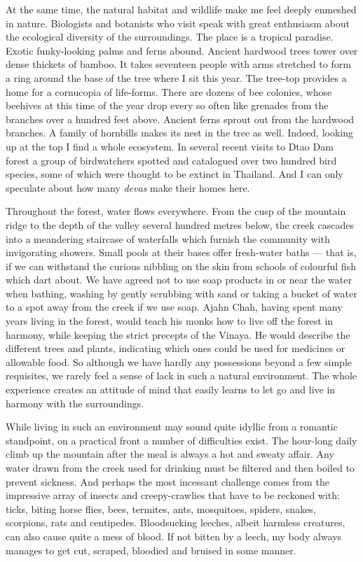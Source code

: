 At the same time, the natural habitat and wildlife make me feel deeply
enmeshed in nature. Biologists and botanists who visit speak with great
enthusiasm about the ecological diversity of the surroundings. The place
is a tropical paradise. Exotic funky-looking palms and ferns abound.
Ancient hardwood trees tower over dense thickets of bamboo. It takes
seventeen people with arms stretched to form a ring around the base of
the tree where I sit this year. The tree-top provides a home for a
cornucopia of life-forms. There are dozens of bee colonies, whose
beehives at this time of the year drop every so often like grenades from
the branches over a hundred feet above. Ancient ferns sprout out from
the hardwood branches. A family of hornbills makes its nest in the tree
as well. Indeed, looking up at the top I find a whole ecosystem. In
several recent visits to Dtao Dam forest a group of birdwatchers spotted
and catalogued over two hundred bird species, some of which were thought
to be extinct in Thailand. And I can only speculate about how many
\emph{devas} make their homes here.

Throughout the forest, water flows everywhere. From the cusp of the
mountain ridge to the depth of the valley several hundred metres below,
the creek cascades into a meandering staircase of waterfalls which
furnish the community with invigorating showers. Small pools at their
bases offer fresh-water baths --- that is, if we can withstand the
curious nibbling on the skin from schools of colourful fish which dart
about. We have agreed not to use soap products in or near the water when
bathing, washing by gently scrubbing with sand or taking a bucket of
water to a spot away from the creek if we use soap. Ajahn Chah, having
spent many years living in the forest, would teach his monks how to live
off the forest in harmony, while keeping the strict precepts of the
Vinaya. He would describe the different trees and plants, indicating
which ones could be used for medicines or allowable food. So although we
have hardly any possessions beyond a few simple requisites, we rarely
feel a sense of lack in such a natural environment. The whole experience
creates an attitude of mind that easily learns to let go and live in
harmony with the surroundings.

While living in such an environment may sound quite idyllic from a
romantic standpoint, on a practical front a number of difficulties
exist. The hour-long daily climb up the mountain after the meal is
always a hot and sweaty affair. Any water drawn from the creek used for
drinking must be filtered and then boiled to prevent sickness. And
perhaps the most incessant challenge comes from the impressive array of
insects and creepy-crawlies that have to be reckoned with: ticks, biting
horse flies, bees, termites, ants, mosquitoes, spiders, snakes,
scorpions, rats and centipedes. Bloodsucking leeches, albeit harmless
creatures, can also cause quite a mess of blood. If not bitten by a
leech, my body always manages to get cut, scraped, bloodied and bruised
in some manner.

